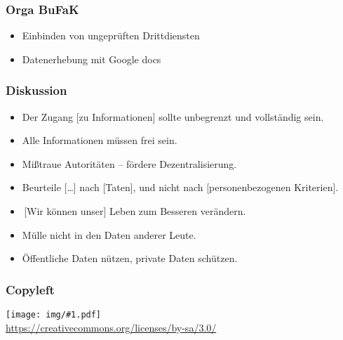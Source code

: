 \documentclass[12pt]{beamer}
\newcommand{\cc}[1]{\texttt{[image: img/\#1.pdf]}}
\begin{document}
\begin{frame}
	\frametitle{Orga BuFaK}
	\begin{itemize}
		\item Einbinden von ungeprüften Drittdiensten
		\item Datenerhebung mit Google docs
	\end{itemize}
\end{frame}

\begin{frame}
	\frametitle{Diskussion}
	\begin{itemize}
		\item Der Zugang [zu Informationen] sollte unbegrenzt und vollständig sein.
		\item Alle Informationen müssen frei sein.
		\item Mißtraue Autoritäten – fördere Dezentralisierung.
		\item Beurteile [\ldots] nach [Taten], und nicht nach [personenbezogenen Kriterien].
		\item \,[Wir können unser] Leben zum Besseren verändern.
		\item Mülle nicht in den Daten anderer Leute.
		\item Öffentliche Daten nützen, private Daten schützen.
	\end{itemize}
\end{frame}

\begin{frame}
	\frametitle{Copyleft}
	\begin{center}
		\cc{cc-by-sa-License} \\
		\footnotesize\url{https://creativecommons.org/licenses/by-sa/3.0/}
	\end{center}
\end{frame}
\end{document}

